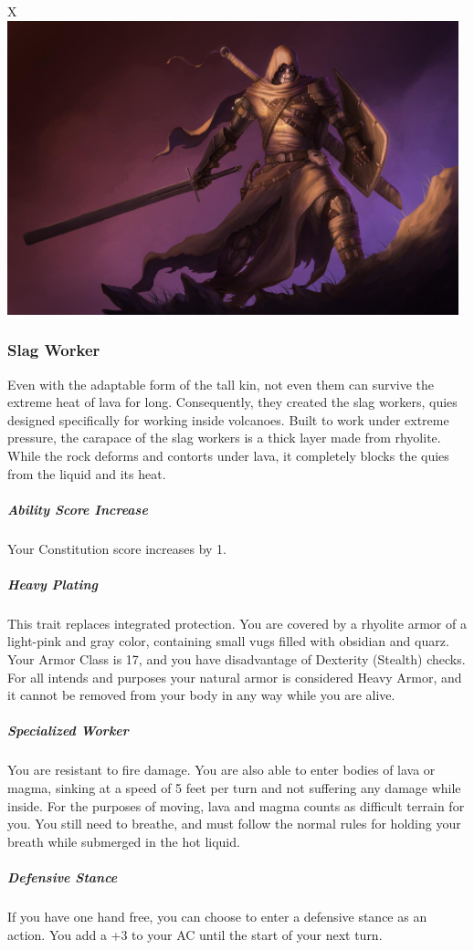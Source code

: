\begin{table}[b]%
    \begin{DndTable}[width=\linewidth]{X}
        \includegraphics[width=0.98\textwidth]{04kins/img/21quies_executioner.jpg}
    \end{DndTable}
\end{table}

\subsubsection{Slag Worker}
    Even with the adaptable form of the tall kin, not even them can survive the extreme heat of lava for long.
    Consequently, they created the slag workers, quies designed specifically for working inside volcanoes.
    Built to work under extreme pressure, the carapace of the slag workers is a thick layer made from rhyolite.
    While the rock deforms and contorts under lava, it completely blocks the quies from the liquid and its heat.

    \subparagraph{Ability Score Increase} Your Constitution score increases by 1.

    \subparagraph{Heavy Plating} This trait replaces integrated protection.
    You are covered by a rhyolite armor of a light-pink and gray color, containing small vugs filled with obsidian and quarz.
    Your Armor Class is 17, and you have disadvantage of Dexterity (Stealth) checks.
    For all intends and purposes your natural armor is considered Heavy Armor, and it cannot be removed from your body in any way while you are alive.

    \subparagraph{Specialized Worker} You are resistant to fire damage.
    You are also able to enter bodies of lava or magma, sinking at a speed of 5 feet per turn and not suffering any damage while inside.
    For the purposes of moving, lava and magma counts as difficult terrain for you.
    You still need to breathe, and must follow the normal rules for holding your breath while submerged in the hot liquid.

    \subparagraph{Defensive Stance} If you have one hand free, you can choose to enter a defensive stance as an action.
    You add a +3 to your AC until the start of your next turn.
